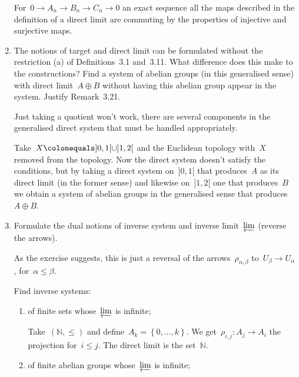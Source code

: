 \documentclass[a4paper,11pt,oneside,openany,article]{memoir}
\begin{document}
\begin{enumerate}
    \begin{solution}
      For~$0\to A_n\to B_n\to C_n\to 0$ an exact sequence all the maps described in the definition of a direct limit are commuting by the properties of injective and surjective maps.
    \end{solution}

  \item The notions of target and direct limit can be formulated without the restriction (a) of Definitions~3.1 and~3.11. What difference does this make to the constructions? Find a system of abelian groups (in this generalised sense) with direct limit~$A\oplus B$ without having this abelian group appear in the system. Justify Remark~3.21.

    \begin{solution}
      Just taking a quotient won't work, there are several components in the generalised direct system that must be handled appropriately.

      Take~$X\colonequals]0,1[\cup]1,2[$ and the Euclidean topology with~$X$ removed from the topology. Now the direct system doesn't satisfy the conditions, but by taking a direct system on~$]0,1[$ that produces~$A$ as its direct limit (in the former sense) and likewise on~$]1,2[$ one that produces~$B$ we obtain a system of abelian groups in the generalised sense that produces~$A\oplus B$.
    \end{solution}

  \item Formulate the dual notions of inverse system and inverse limit~$\varprojlim$ (reverse the arrows).

    \begin{solution}
      As the exercise suggests, this is just a reversal of the arrows~$\rho_{\alpha,\beta}$ to~$U_\beta\to U_\alpha$, for~$\alpha\leq\beta$.
    \end{solution}
    
    Find inverse systems:
    \begin{enumerate}
      \item of finite sets whose~$\varprojlim$ is infinite;

        \begin{solution}
          Take~$(\mathbb{N},\leq)$ and define~$A_k=\left\{ 0,\ldots,k \right\}$. We get~$\rho_{i,j}\colon A_j\to A_i$ the projection for~$i\leq j$. The direct limit is the set~$\mathbb{N}$.
        \end{solution}

      \item of finite abelian groups whose~$\varprojlim$ is infinite;


\end{enumerate}
\end{enumerate}
\end{document}
